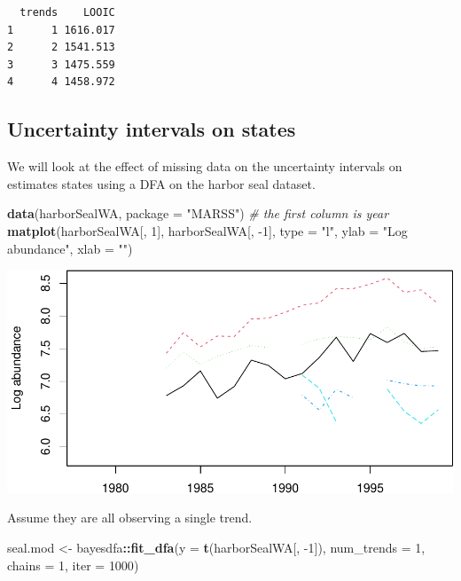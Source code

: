 \documentclass[
]{article}
\newenvironment{Shaded}{\begin{snugshade}}{\end{snugshade}}
\newcommand{\CommentTok}[1]{\textcolor[rgb]{0.56,0.35,0.01}{\textit{#1}}}
\newcommand{\DataTypeTok}[1]{\textcolor[rgb]{0.13,0.29,0.53}{#1}}
\newcommand{\DecValTok}[1]{\textcolor[rgb]{0.00,0.00,0.81}{#1}}
\newcommand{\KeywordTok}[1]{\textcolor[rgb]{0.13,0.29,0.53}{\textbf{#1}}}
\newcommand{\NormalTok}[1]{#1}
\newcommand{\OperatorTok}[1]{\textcolor[rgb]{0.81,0.36,0.00}{\textbf{#1}}}
\newcommand{\StringTok}[1]{\textcolor[rgb]{0.31,0.60,0.02}{#1}}
\begin{document}
\begin{verbatim}
  trends    LOOIC
1      1 1616.017
2      2 1541.513
3      3 1475.559
4      4 1458.972
\end{verbatim}

\hypertarget{sec-stan-state-uncertainty}{%
\subsection{Uncertainty intervals on
states}\label{sec-stan-state-uncertainty}}

We will look at the effect of missing data on the uncertainty intervals
on estimates states using a DFA on the harbor seal dataset.

\begin{Shaded}
\begin{Highlighting}[]
\KeywordTok{data}\NormalTok{(harborSealWA, }\DataTypeTok{package =} \StringTok{"MARSS"}\NormalTok{)}
\CommentTok{# the first column is year}
\KeywordTok{matplot}\NormalTok{(harborSealWA[, }\DecValTok{1}\NormalTok{], harborSealWA[, }\DecValTok{-1}\NormalTok{], }\DataTypeTok{type =} \StringTok{"l"}\NormalTok{, }\DataTypeTok{ylab =} \StringTok{"Log abundance"}\NormalTok{, }
    \DataTypeTok{xlab =} \StringTok{""}\NormalTok{)}
\end{Highlighting}
\end{Shaded}

\begin{center}\includegraphics[width=0.8\linewidth]{fitting-models-with-stan_files/figure-latex/stan-harborseal-data-1} \end{center}

Assume they are all observing a single trend.

\begin{Shaded}
\begin{Highlighting}[]
\NormalTok{seal.mod <-}\StringTok{ }\NormalTok{bayesdfa}\OperatorTok{::}\KeywordTok{fit_dfa}\NormalTok{(}\DataTypeTok{y =} \KeywordTok{t}\NormalTok{(harborSealWA[, }\DecValTok{-1}\NormalTok{]), }\DataTypeTok{num_trends =} \DecValTok{1}\NormalTok{, }
    \DataTypeTok{chains =} \DecValTok{1}\NormalTok{, }\DataTypeTok{iter =} \DecValTok{1000}\NormalTok{)}
\end{Highlighting}
\end{Shaded}
\end{document}
